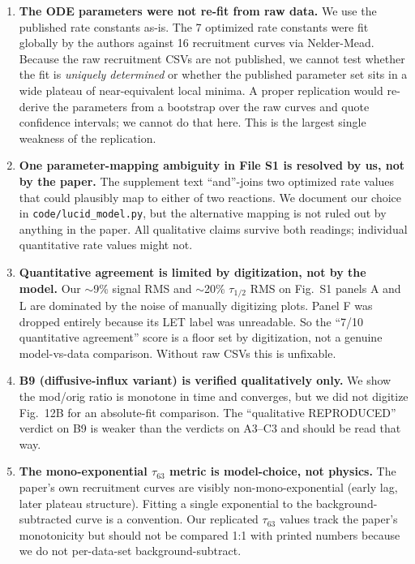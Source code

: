 \documentclass[11pt]{article}
\begin{document}
\begin{enumerate}
\item \textbf{The ODE parameters were not re-fit from raw data.} We use the published rate
constants as-is. The 7 optimized rate constants were fit globally by the authors against 16
recruitment curves via Nelder-Mead. Because the raw recruitment CSVs are not published, we
cannot test whether the fit is \emph{uniquely determined} or whether the published parameter
set sits in a wide plateau of near-equivalent local minima. A proper replication would
re-derive the parameters from a bootstrap over the raw curves and quote confidence intervals;
we cannot do that here. This is the largest single weakness of the replication.

\item \textbf{One parameter-mapping ambiguity in File S1 is resolved by us, not by the paper.}
The supplement text ``and''-joins two optimized rate values that could plausibly map to either
of two reactions. We document our choice in \texttt{code/lucid\_model.py}, but the alternative
mapping is not ruled out by anything in the paper. All qualitative claims survive both readings;
individual quantitative rate values might not.

\item \textbf{Quantitative agreement is limited by digitization, not by the model.}
Our $\sim$9\% signal RMS and $\sim$20\% $\tau_{1/2}$ RMS on Fig.~S1 panels A and L are dominated
by the noise of manually digitizing plots. Panel F was dropped entirely because its LET label
was unreadable. So the ``7/10 quantitative agreement'' score is a floor set by digitization,
not a genuine model-vs-data comparison. Without raw CSVs this is unfixable.

\item \textbf{B9 (diffusive-influx variant) is verified qualitatively only.} We show the
mod/orig ratio is monotone in time and converges, but we did not digitize Fig.~12B for an
absolute-fit comparison. The ``qualitative REPRODUCED'' verdict on B9 is weaker than the
verdicts on A3--C3 and should be read that way.

\item \textbf{The mono-exponential $\tau_{63}$ metric is model-choice, not physics.}
The paper's own recruitment curves are visibly non-mono-exponential (early lag, later
plateau structure). Fitting a single exponential to the background-subtracted curve is a
convention. Our replicated $\tau_{63}$ values track the paper's monotonicity but should not be
compared 1:1 with printed numbers because we do not per-data-set background-subtract.


\end{enumerate}
\end{document}
